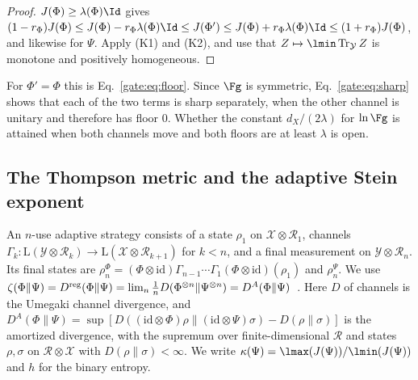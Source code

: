 \begin{proof}
$J(\Phi)\ge\lambda(\Phi)\Id$ gives $(1-r_\Phi)J(\Phi)\le J(\Phi)-r_\Phi\lambda(\Phi)\Id\le J(\Phi')\le J(\Phi)+r_\Phi\lambda(\Phi)\Id\le(1+r_\Phi)J(\Phi)$, and likewise for $\Psi$. Apply (K1) and (K2), and use that $Z\mapsto\lmin\Tr_{\mathcal Y}Z$ is monotone and positively homogeneous.
\end{proof}

For $\Phi'=\Phi$ this is Eq.~\eqref{gate:eq:floor}. Since $\Fg$ is symmetric, Eq.~\eqref{gate:eq:sharp} shows that each of the two terms is sharp separately, when the other channel is unitary and therefore has floor $0$. Whether the constant $d_X/(2\lambda)$ for $\ln\Fg$ is attained when both channels move and both floors are at least $\lambda$ is open.

\subsection*{The Thompson metric and the adaptive Stein exponent}

An $n$-use adaptive strategy consists of a state $\rho_1$ on $\mathcal X\otimes\mathcal R_1$, channels $\Gamma_k:\mathrm L(\mathcal Y\otimes\mathcal R_k)\to\mathrm L(\mathcal X\otimes\mathcal R_{k+1})$ for $k<n$, and a final measurement on $\mathcal Y\otimes\mathcal R_n$. Its final states are $\rho^\Phi_n=(\Phi\otimes\mathrm{id})\Gamma_{n-1}\cdots\Gamma_1(\Phi\otimes\mathrm{id})(\rho_1)$ and $\rho^\Psi_n$. We use $\zeta(\Phi\|\Psi)=D^{\rm reg}(\Phi\|\Psi)=\lim_n\frac1nD(\Phi^{\otimes n}\|\Psi^{\otimes n})=D^A(\Phi\|\Psi)$~\cite{WangWilde2019,FFRS2020}. Here $D$ of channels is the Umegaki channel divergence, and $D^A(\Phi\|\Psi)=\sup[D((\mathrm{id}\otimes\Phi)\rho\|(\mathrm{id}\otimes\Psi)\sigma)-D(\rho\|\sigma)]$ is the amortized divergence, with the supremum over finite-dimensional $\mathcal R$ and states $\rho,\sigma$ on $\mathcal R\otimes\mathcal X$ with $D(\rho\|\sigma)<\infty$. We write $\kappa(\Psi)=\lmax(J(\Psi))/\lmin(J(\Psi))$ and $h$ for the binary entropy.

